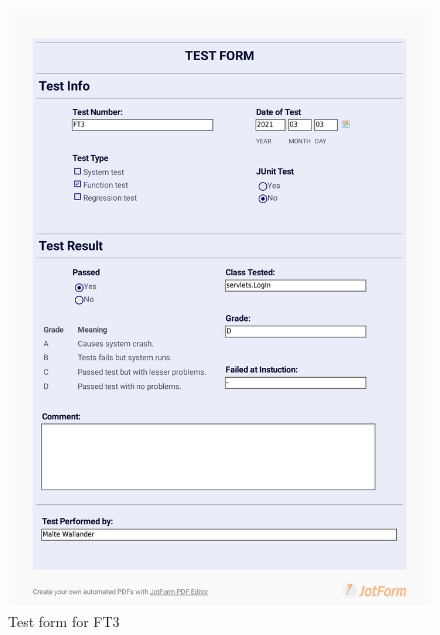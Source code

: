 \documentclass{article}
\begin{document}
  \begin{figure}
     \centering
     \includegraphics[width=13cm]{images/2021-03-03_Malte_FT3-1}
     \renewcommand\figurename{Figure}
     \caption{Test form for FT3}
     \label{fig:my_label}
 \end{figure}
 
\end{document}
